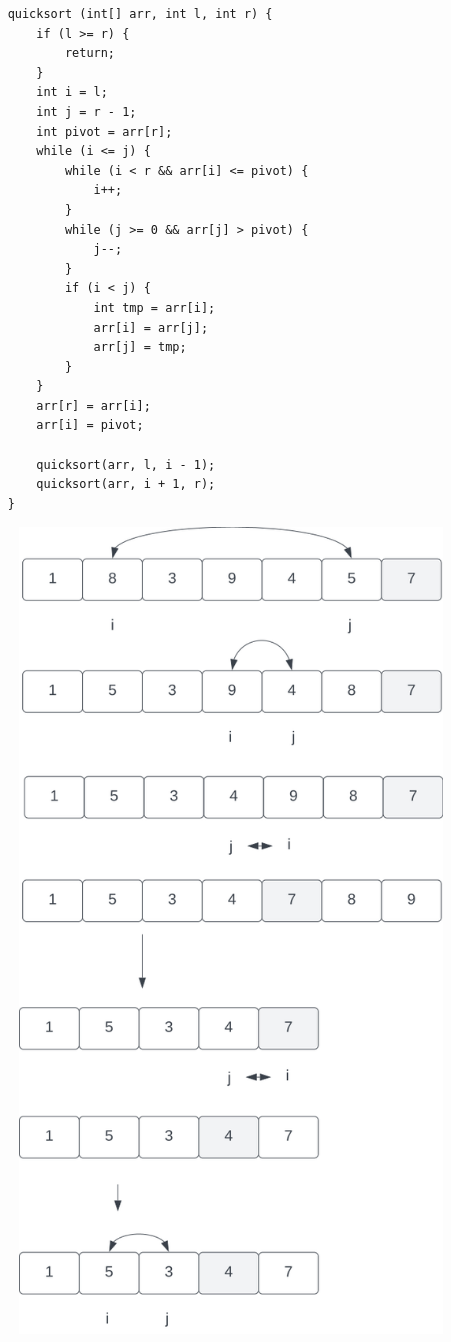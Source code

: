 \begin{verbatim}
    quicksort (int[] arr, int l, int r) {
        if (l >= r) {
            return;
        }
        int i = l;
        int j = r - 1;
        int pivot = arr[r];
        while (i <= j) {
            while (i < r && arr[i] <= pivot) {
                i++;
            }
            while (j >= 0 && arr[j] > pivot) {
                j--;
            }
            if (i < j) {
                int tmp = arr[i];
                arr[i] = arr[j];
                arr[j] = tmp;
            }
        }
        arr[r] = arr[i];
        arr[i] = pivot;

        quicksort(arr, l, i - 1);
        quicksort(arr, i + 1, r);
    }
\end{verbatim}

\begin{figure}
    \begin{center}
        \includegraphics[scale=0.3]{chapters/Sortierverfahren/img/quicksort1}

\end{center}
\end{figure}
